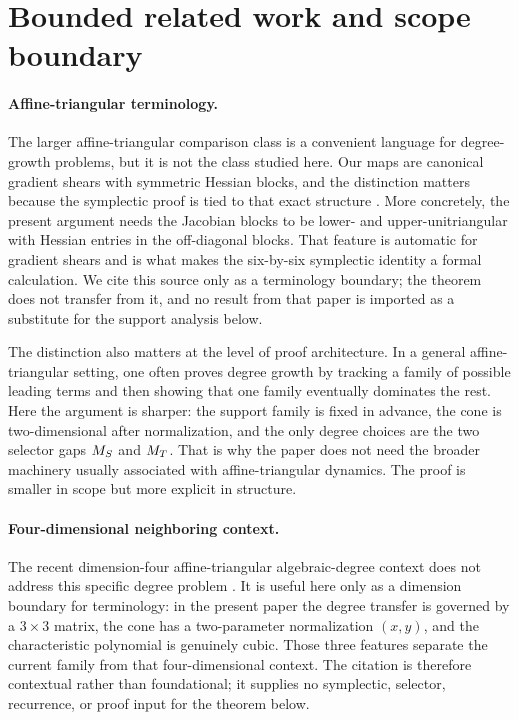 \documentclass[11pt]{article}
\theoremstyle{remark}
\numberwithin{equation}{section}
\begin{document}
\section{Bounded related work and scope boundary}\label{sec:related}

\paragraph{Affine-triangular terminology.}
The larger affine-triangular comparison class is a convenient language for
degree-growth problems, but it is not the class studied here.  Our maps are
canonical gradient shears with symmetric Hessian blocks, and the distinction
matters because the symplectic proof is tied to that exact structure
\citep{BlancVanSanten2019}.  More concretely, the present argument needs the
Jacobian blocks to be lower- and upper-unitriangular with Hessian entries in
the off-diagonal blocks.  That feature is automatic for gradient shears and is
what makes the six-by-six symplectic identity a formal calculation.  We cite
this source only as a terminology boundary; the theorem does not transfer from
it, and no result from that paper is imported as a substitute for the support
analysis below.

The distinction also matters at the level of proof architecture.  In a general
affine-triangular setting, one often proves degree growth by tracking a family
of possible leading terms and then showing that one family eventually dominates
the rest.  Here the argument is sharper: the support family is fixed in advance,
the cone is two-dimensional after normalization, and the only degree choices are
the two selector gaps \(M_S\) and \(M_T\).  That is why the paper does not need
the broader machinery usually associated with affine-triangular dynamics.  The
proof is smaller in scope but more explicit in structure.

\paragraph{Four-dimensional neighboring context.}
The recent dimension-four affine-triangular algebraic-degree context does not
address this specific degree problem \citep{ShaoSun2025}.  It is useful here
only as a dimension boundary for terminology: in the present paper the degree
transfer is governed by a \(3\times 3\) matrix, the cone has a two-parameter
normalization \((x,y)\), and the characteristic polynomial is genuinely
cubic.  Those three features separate the current family from that
four-dimensional context.  The citation is therefore contextual rather than
foundational; it supplies no symplectic, selector, recurrence, or proof input
for the theorem below.
\end{document}
